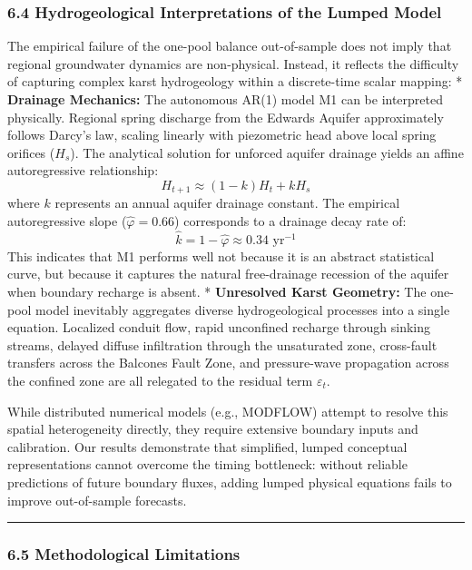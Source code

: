 \documentclass[11pt]{article}
\begin{document}
\subsubsection{6.4 Hydrogeological Interpretations of the Lumped
Model}\label{hydrogeological-interpretations-of-the-lumped-model}

The empirical failure of the one-pool balance out-of-sample does not
imply that regional groundwater dynamics are non-physical. Instead, it
reflects the difficulty of capturing complex karst hydrogeology within a
discrete-time scalar mapping: * \textbf{Drainage Mechanics:} The
autonomous AR(1) model M1 can be interpreted physically. Regional spring
discharge from the Edwards Aquifer approximately follows Darcy's law,
scaling linearly with piezometric head above local spring orifices
(\(H_s\)). The analytical solution for unforced aquifer drainage yields
an affine autoregressive relationship:
\[H_{t+1} \approx (1 - k) H_t + k H_s\] where \(k\) represents an annual
aquifer drainage constant. The empirical autoregressive slope
(\(\hat{\varphi} = 0.66\)) corresponds to a drainage decay rate of:
\[\hat{k} = 1 - \hat{\varphi} \approx 0.34\text{ yr}^{-1}\] This
indicates that M1 performs well not because it is an abstract
statistical curve, but because it captures the natural free-drainage
recession of the aquifer when boundary recharge is absent. *
\textbf{Unresolved Karst Geometry:} The one-pool model inevitably
aggregates diverse hydrogeological processes into a single equation.
Localized conduit flow, rapid unconfined recharge through sinking
streams, delayed diffuse infiltration through the unsaturated zone,
cross-fault transfers across the Balcones Fault Zone, and pressure-wave
propagation across the confined zone are all relegated to the residual
term \(\varepsilon_t\).

While distributed numerical models (e.g., MODFLOW) attempt to resolve
this spatial heterogeneity directly, they require extensive boundary
inputs and calibration. Our results demonstrate that simplified, lumped
conceptual representations cannot overcome the timing bottleneck:
without reliable predictions of future boundary fluxes, adding lumped
physical equations fails to improve out-of-sample forecasts.

\begin{center}\rule{0.5\linewidth}{0.5pt}\end{center}

\subsubsection{6.5 Methodological
Limitations}\label{methodological-limitations}
\end{document}
